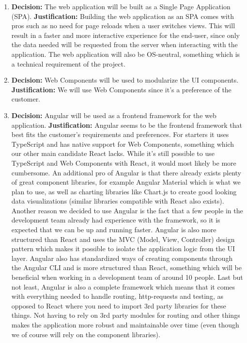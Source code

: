 \documentclass{article}
\begin{document}
\begin{enumerate}
    \item \textbf{Decision:} The web application will be built as a Single Page Application (SPA).
        \linebreak{}
        \textbf{Justification:} Building the web application as an SPA comes with pros such as no need for page reloads when a user switches views. This will result in a faster and more interactive experience for the end-user, since only the data needed will be requested from the server when interacting with the application. The web application will also be OS-neutral, something which is a technical requirement of the project.
        
    \item \textbf{Decision:} Web Components will be used to modularize the UI components.  
    \linebreak{}
    \textbf{Justification:} We will use Web Components since it's a preference of the customer.
    
    \item \textbf{Decision:} Angular will be used as a frontend framework for the web application.
    \linebreak{}
    \textbf{Justification:} Angular seems to be the frontend framework that best fits the customer's requirements and preferences. For starters it uses TypeScript and has native support for Web Components, something which our other main candidate React lacks. While it's still possible to use TypeScript and Web Components with React, it would most likely be more cumbersome. An additional pro of Angular is that there already exists plenty of great component libraries, for example Angular Material which is what we plan to use, as well as charting libraries like Chart.js to create good looking data visualizations (similar libraries compatible with React also exists). Another reason we decided to use Angular is the fact that a few people in the development team already had experience with the framework, so it is expected that we can be up and running faster. Angular is also more structured than React and uses the MVC (Model, View, Controller) design pattern which makes it possible to isolate the application logic from the UI layer.
    Angular also has standardized ways of creating components through the Angular CLI and is more structured than React, something which will be beneficial when working in a development team of around 10 people. Last but not least, Angular is also a complete framework which means that it comes with everything needed to handle routing, http-requests and testing, as opposed to React where you need to import 3rd party libraries for these things. Not having to rely on 3rd party modules for routing and other things makes the application more robust and maintainable over time (even though we of course will rely on the component libraries). 
    

\end{enumerate}
\end{document}
